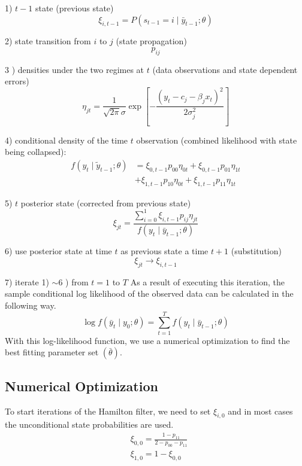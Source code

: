 \documentclass[UTF8,12pt]{ctexart}
\numberwithin{equation}{section}%
\begin{document}
	1) $t-1$ state (previous state)
	$$
	\xi_{i, t-1}=P\left(s_{t-1}=i \mid \bar{y}_{t-1} ; \theta\right)
	$$

	2) state transition from $i$ to $j$ (state propagation)
	$$p_{i j}$$
	
	3 ) densities under the two regimes at $t$ (data observations and state dependent errors)
	$$
	\eta_{j t}=\frac{1}{\sqrt{2 \pi} \sigma} \exp \left[-\frac{\left(y_t-c_j-\beta_j x_t\right)^2}{2 \sigma_j^2}\right]
	$$

	4) conditional density of the time $t$ observation (combined likelihood with state being collapsed):
	$$
	\begin{aligned}
		f\left(y_t \mid \tilde{y}_{t-1} ; \theta\right) & =\xi_{0, t-1} p_{00} \eta_{0 t}+\xi_{0, t-1} p_{01} \eta_{1 t} \\
		& +\xi_{1, t-1} p_{10} \eta_{0 t}+\xi_{1, t-1} p_{11} \eta_{1 t}
	\end{aligned}
	$$

	5) $t$ posterior state (corrected from previous state)
	$$
	\xi_{j t}=\frac{\sum_{i=0}^1 \xi_{i, t-1} p_{i j} \eta_{j t}}{f\left(y_t \mid \bar{y}_{t-1} ; \theta\right)}
	$$

	6) use posterior state at time $t$ as previous state a time $t+1$ (substitution)
	$$
	\xi_{j t} \rightarrow \xi_{i, t-1}
	$$

	7) iterate 1) $\sim 6$ ) from $t=1$ to $T$
	As a result of executing this iteration, the sample conditional log likelihood of the observed data can be calculated in the following way.
	$$
	\log f\left(\bar{y}_t \mid y_0 ; \theta\right)=\sum_{t=1}^T f\left(y_t \mid \bar{y}_{t-1} ; \theta\right)
	$$
	With this log-likelihood function, we use a numerical optimization to find the best fitting parameter set $(\bar{\theta})$.
	
	\subsection{Numerical Optimization}
	To start iterations of the Hamilton filter, we need to set $\xi_{i, 0}$ and in most cases the unconditional state probabilities are used.
	$$
	\begin{aligned}
		& \xi_{0,0}=\frac{1-p_{11}}{2-p_{00}-p_{11}} \\
		& \xi_{1,0}=1-\xi_{0,0}
	\end{aligned}
	$$
	

%
%		
	
	\newpage
\end{document}
